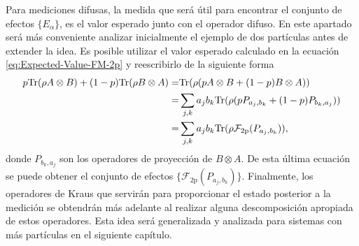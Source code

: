 



Para mediciones difusas, la medida que será útil para encontrar el conjunto de
efectos $\{E_\alpha\}$, es el valor esperado junto con el operador difuso. En
este apartado será más conveniente analizar inicialmente el ejemplo de dos
partículas antes de extender la idea.  Es posible utilizar el valor esperado
calculado en la ecuación {\eqref{eq:Expected-Value-FM-2p}} y reescribirlo de la
siguiente forma
\begin{equation}\label{eq:ordenar-valoresperado-povm}
\begin{split}
    p{\rm Tr}(\rho A\otimes B)+ (1-p){\rm Tr}(\rho B\otimes A)
    =& {\rm Tr}(\rho (pA\otimes B+(1-p)B\otimes A))\\
    =&\sum_{j,k}{a_j b_k}{\rm Tr}(\rho (pP_{a_j,b_k}+(1-p)P_{b_k, a_j}))\\
    =&\sum_{j, k}{a_j b_k}{\rm Tr}(\rho \mathcal{F}_{2\text{p}}(P_{a_j,b_k})),\\
\end{split}
\end{equation} 
donde $P_{b_k,a_j}$ son los operadores de proyección de $B\otimes A$. De
esta última ecuación se puede obtener el conjunto de efectos
$\{\mathcal{F}_{2\text{p}}(P_{a_j,b_k})\}$. Finalmente, los operadores de Kraus
que servirán para proporcionar el estado posterior a la medición se obtendrán
más adelante al realizar alguna descomposición apropiada de estos operadores.
Esta idea será generalizada y analizada para sistemas con más partículas en el
siguiente capítulo. 

